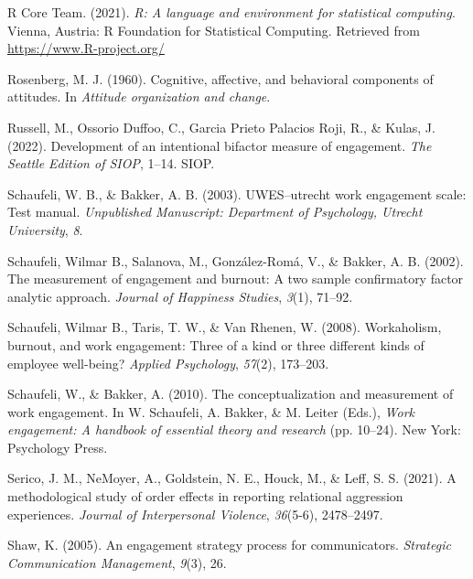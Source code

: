 \documentclass[
  man]{apa6}
\newlength{\cslhangindent}
\newlength{\cslentryspacingunit} %
\newenvironment{CSLReferences}[2] %
 {%
  \setlength{\parindent}{0pt}
  \ifodd #1
  \let\oldpar\par
  \def\par{\hangindent=\cslhangindent\oldpar}
  \fi
  \setlength{\parskip}{#2\cslentryspacingunit}
 }%
 {}
\begin{document}
\begin{CSLReferences}{1}{0}
\leavevmode{}%
R Core Team. (2021). \emph{R: A language and environment for statistical computing}. Vienna, Austria: R Foundation for Statistical Computing. Retrieved from \url{https://www.R-project.org/}

\leavevmode{}%
Rosenberg, M. J. (1960). Cognitive, affective, and behavioral components of attitudes. In \emph{Attitude organization and change}.

\leavevmode{}%
Russell, M., Ossorio Duffoo, C., Garcia Prieto Palacios Roji, R., \& Kulas, J. (2022). Development of an intentional bifactor measure of engagement. \emph{The Seattle Edition of SIOP}, 1--14. SIOP.

\leavevmode{}%
Schaufeli, W. B., \& Bakker, A. B. (2003). {UWES}--utrecht work engagement scale: Test manual. \emph{Unpublished Manuscript: Department of Psychology, Utrecht University}, \emph{8}.

\leavevmode{}%
Schaufeli, Wilmar B., Salanova, M., González-Romá, V., \& Bakker, A. B. (2002). The measurement of engagement and burnout: A two sample confirmatory factor analytic approach. \emph{Journal of Happiness Studies}, \emph{3}(1), 71--92.

\leavevmode{}%
Schaufeli, Wilmar B., Taris, T. W., \& Van Rhenen, W. (2008). Workaholism, burnout, and work engagement: Three of a kind or three different kinds of employee well-being? \emph{Applied Psychology}, \emph{57}(2), 173--203.

\leavevmode{}%
Schaufeli, W., \& Bakker, A. (2010). The conceptualization and measurement of work engagement. In W. Schaufeli, A. Bakker, \& M. Leiter (Eds.), \emph{Work engagement: A handbook of essential theory and research} (pp. 10--24). New York: Psychology Press.

\leavevmode{}%
Serico, J. M., NeMoyer, A., Goldstein, N. E., Houck, M., \& Leff, S. S. (2021). A methodological study of order effects in reporting relational aggression experiences. \emph{Journal of Interpersonal Violence}, \emph{36}(5-6), 2478--2497.

\leavevmode{}%
Shaw, K. (2005). An engagement strategy process for communicators. \emph{Strategic Communication Management}, \emph{9}(3), 26.


\end{CSLReferences}
\end{document}
